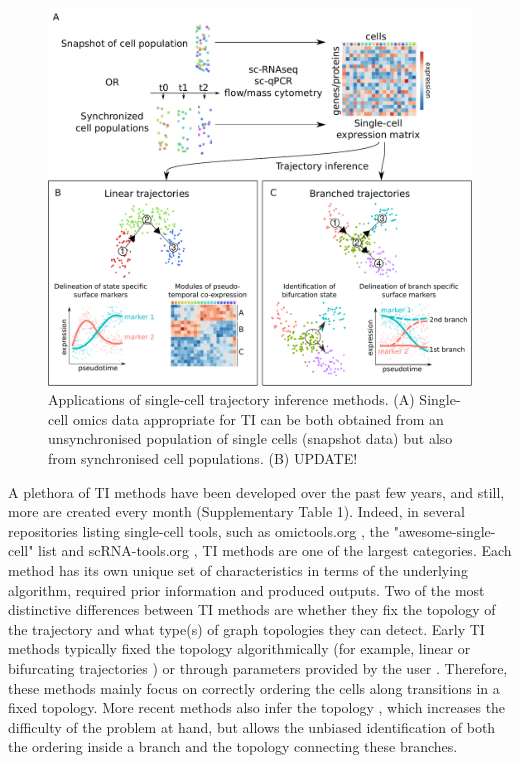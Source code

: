 \begin{figure}
	\centering\includegraphics[width=\Largefigure]{fig/introduction/trajectory_inference_slim} %
	\caption{
		Applications of single-cell trajectory inference methods. (A) Single-cell omics data appropriate for TI can be both obtained from an unsynchronised population of single cells (snapshot data) but also from synchronised cell populations. (B) UPDATE!
	}
	\label{fig:trajectory_inference}
\end{figure}

A plethora of TI methods have been developed over the past few years, and still, more are created every month (Supplementary Table 1). Indeed, in several repositories listing single-cell tools, such as omictools.org \cite{henry_omictoolsinformativedirectory_2014}, the "awesome-single-cell" list \cite{davis_awesomesinglecell_2018} and scRNA-tools.org \cite{zappia_exploringsinglecellrnaseq_2017}, TI methods are one of the largest categories. Each method has its own unique set of characteristics in terms of the underlying algorithm, required prior information and produced outputs. Two of the most distinctive differences between TI methods are whether they fix the topology of the trajectory and what type(s) of graph topologies they can detect. Early TI methods typically fixed the topology algorithmically (for example, linear \cite{bendall_singlecelltrajectorydetection_2014,schlitzer_identificationcdc1cdc2committed_2015,shin_singlecellrnaseqwaterfall_2015,campbell_bayesiangaussianprocess_2015} or bifurcating trajectories \cite{haghverdi_diffusionpseudotimerobustly_2016,setty_wishboneidentifiesbifurcating_2016}) or through parameters provided by the user \cite{trapnell_dynamicsregulatorscell_2014,matsumoto_scoupprobabilisticmodel_2016}. Therefore, these methods mainly focus on correctly ordering the cells along transitions in a fixed topology. More recent methods also infer the topology \cite{qiu_reversedgraphembedding_2017,street_slingshotcelllineage_2018,wolf_graphabstractionreconciles_2017}, which increases the difficulty of the problem at hand, but allows the unbiased identification of both the ordering inside a branch and the topology connecting these branches.


